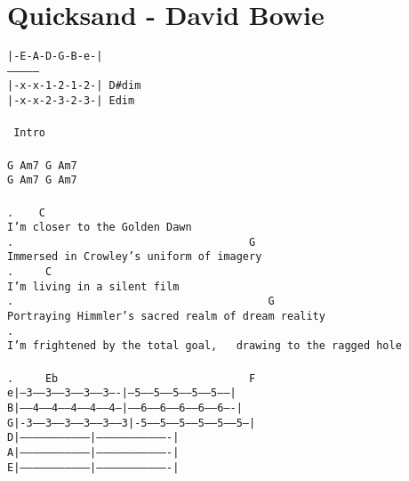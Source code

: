 \newpage
\section{Quicksand - David Bowie}
\label{Quicksand - David Bowie}
\texttt{|-E-A-D-G-B-e-|\\
---------------\\
|-x-x-1-2-1-2-| D\#dim\ \ \ \\
|-x-x-2-3-2-3-| Edim\\
\\
\lbrack\ Intro\rbrack\\
\\
G\ Am7\ G\ Am7\\
G\ Am7\ G\ Am7\\
\\
.\ \ \ \ C\\
I'm\ closer\ to\ the\ Golden\ Dawn\\
.\ \ \ \ \ \ \ \ \ \ \ \ \ \ \ \ \ \ \ \ \ \ \ \ \ \ \ \ \ \ \ \ \ \ \ \ \ G\\
Immersed\ in\ Crowley's\ uniform\ of\ imagery\\
.\ \ \ \ \ C\\
I'm\ living\ in\ a\ silent\ film\\
.\ \ \ \ \ \ \ \ \ \ \ \ \ \ \ \ \ \ \ \ \ \ \ \ \ \ \ \ \ \ \ \ \ \ \ \ \ \ \ \ G\\
Portraying\ Himmler's\ sacred\ realm\ of\ dream\ reality\\
.\ \ \ \ \ \ \ \ \ \ \ \ \ \ \ \ \ \ \ \ \ \ \ \ \ \ \ \ \ \ \ \ \ \ \ \\
I'm\ frightened\ by\ the\ total\ goal,\ \ \ drawing\ to\ the\ ragged\ hole\\
\\
.\ \ \ \ \ Eb\ \ \ \ \ \ \ \ \ \ \ \ \ \ \ \ \ \ \ \ \ \ \ \ \ \ \ \ \ \ F\\
e|---3-----3-----3-----3-----3----|---5-----5-----5-----5-----5------|\\
B|-----4-----4-----4-----4-----4--|-----6-----6-----6-----6-----6----|\\
G|-3-----3-----3-----3-----3-----3|-5-----5-----5-----5-----5-----5--|\\
D|--------------------------------|----------------------------------|\\
A|--------------------------------|----------------------------------|\\
E|--------------------------------|----------------------------------|\\
\\
}

